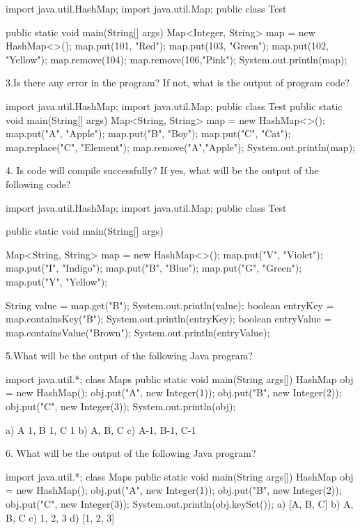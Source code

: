 import java.util.HashMap;
import java.util.Map;
public class Test {
public static void main(String[] args) 
{
 Map<Integer, String> map = new HashMap<>();
 map.put(101, "Red");
 map.put(103, "Green");
 map.put(102, "Yellow");
 map.remove(104);
 map.remove(106,"Pink");
 System.out.println(map);
 }


3.Is there any error in the program? If not, what is the output of program code?

import java.util.HashMap;
import java.util.Map;
public class Test {
public static void main(String[] args) 
{
 Map<String, String> map = new HashMap<>();
 map.put("A", "Apple");
 map.put("B", "Boy");
 map.put("C", "Cat");
 map.replace("C", "Element");
 map.remove("A","Apple");
 System.out.println(map);
 }
}

     


4. Is code will compile successfully? If yes, what will be the output of the following code?

import java.util.HashMap;
import java.util.Map;
public class Test {
public static void main(String[] args) 
{
 Map<String, String> map = new HashMap<>();
 map.put("V", "Violet");
 map.put("I", "Indigo");
 map.put("B", "Blue");
 map.put("G", "Green");
 map.put("Y", "Yellow");
 
 String value = map.get("B");
 System.out.println(value);
 boolean entryKey = map.containsKey("B");
 System.out.println(entryKey);
 boolean entryValue = map.containsValue("Brown");
 System.out.println(entryValue);
 }
}

	  
5.What will be the output of the following Java program?

 import java.util.*;
    class Maps 
    {
        public static void main(String args[]) 
        {
            HashMap obj = new HashMap();
            obj.put("A", new Integer(1));
            obj.put("B", new Integer(2));
            obj.put("C", new Integer(3));
            System.out.println(obj);
        }
    }
	
a) {A 1, B 1, C 1}
b) {A, B, C}
c) {A-1, B-1, C-1}


6. What will be the output of the following Java program?

  import java.util.*;
    class Maps 
    {
        public static void main(String args[]) 
        {
            HashMap obj = new HashMap();
            obj.put("A", new Integer(1));
            obj.put("B", new Integer(2));
            obj.put("C", new Integer(3));
            System.out.println(obj.keySet());
        }
    }
a) [A, B, C]
b) {A, B, C}
c) {1, 2, 3}
d) [1, 2, 3]

}
